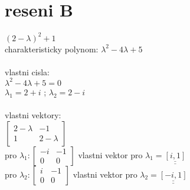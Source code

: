 \documentclass[a4paper]{article}
\def\doubleunderline#1{\underline{\underline{#1}}}
\begin{document}
\section*{reseni B}
$(2-\lambda)^2+1$\\
charakteristicky polynom: \doubleunderline{$\lambda^2-4\lambda+5$}\\
\\
vlastni cisla:\\
$\lambda^2-4\lambda+5=0$\\
\doubleunderline{$\lambda_1 = 2+i$} ; 
\doubleunderline{$\lambda_2 = 2-i$}\\
\\
vlastni vektory:\\
$
\left[\begin{matrix}
	2-\lambda & -1\\
	1 & 2-\lambda
	\end{matrix}\right]
$\\
pro $\lambda_1: \left[\begin{matrix}
	-i & -1\\
	0& 0
	\end{matrix}\right]$
vlastni vektor pro $\lambda_1 = \doubleunderline{[i,1]}$\\
pro $\lambda_2: \left[\begin{matrix}
	i & -1\\
	0 & 0
	\end{matrix}\right]$
vlastni vektor pro $\lambda_2 = \doubleunderline{[-i,1]}$\\
\end{document}

